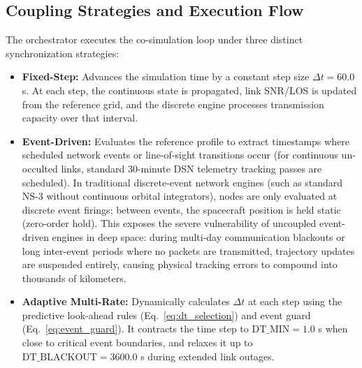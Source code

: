 \documentclass[a4paper,fleqn]{cas-sc}
\begin{document}
\subsection{Coupling Strategies and Execution Flow}
The orchestrator executes the co-simulation loop under three distinct synchronization strategies:
\begin{itemize}
    \item \textbf{Fixed-Step:} Advances the simulation time by a constant step size $\Delta t = 60.0$ s. At each step, the continuous state is propagated, link SNR/LOS is updated from the reference grid, and the discrete engine processes transmission capacity over that interval.
    \item \textbf{Event-Driven:} Evaluates the reference profile to extract timestamps where scheduled network events or line-of-sight transitions occur (for continuous un-occulted links, standard 30-minute DSN telemetry tracking passes are scheduled). In traditional discrete-event network engines (such as standard NS-3 without continuous orbital integrators), nodes are only evaluated at discrete event firings; between events, the spacecraft position is held static (zero-order hold). This exposes the severe vulnerability of uncoupled event-driven engines in deep space: during multi-day communication blackouts or long inter-event periods where no packets are transmitted, trajectory updates are suspended entirely, causing physical tracking errors to compound into thousands of kilometers.
    \item \textbf{Adaptive Multi-Rate:} Dynamically calculates $\Delta t$ at each step using the predictive look-ahead rules (Eq.~\eqref{eq:dt_selection}) and event guard (Eq.~\eqref{eq:event_guard}). It contracts the time step to $\text{DT\_MIN} = 1.0$ s when close to critical event boundaries, and relaxes it up to $\text{DT\_BLACKOUT} = 3600.0$ s during extended link outages.
\end{itemize}
\end{document}
